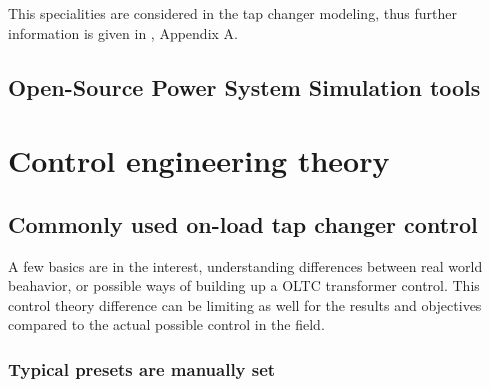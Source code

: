 
This specialities are considered in the tap changer modeling, thus further information is given in \autocite{machowskiPowerSystemDynamics2020}, Appendix A.

\subsection{Open-Source Power System Simulation tools}


\section{Control engineering theory}

\subsection{Commonly used on-load tap changer control}

A few basics are in the interest, understanding differences between real world beahavior, or possible ways of building up a \acs{OLTC} transformer control. This control theory difference can be limiting as well for the results and objectives compared to the actual possible control in the field.

\subsubsection{Typical presets are manually set}

